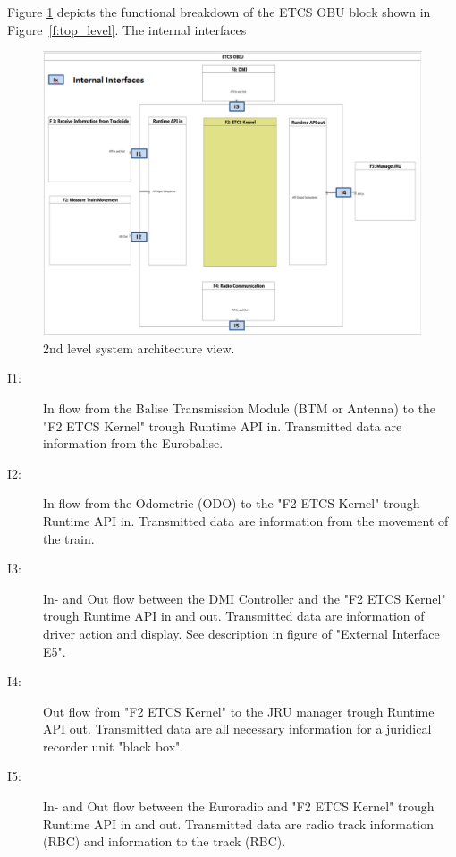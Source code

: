 Figure \ref{f:ETCS_OBU_decomposition} depicts the functional breakdown of the ETCS OBU block shown in Figure~\ref{f:top_level}. The internal interfaces
\begin{figure}
\centering
\includegraphics[width=\textwidth]{images/2ndlevelarchitecture}
\caption{2nd level system architecture view.}
\label{f:ETCS_OBU_decomposition}
\end{figure}
\begin{description}
\item[I1:] In flow from the Balise Transmission Module (BTM or Antenna) to the "F2 ETCS Kernel" trough Runtime API in. Transmitted data are information from the Eurobalise.

\item[I2:] In flow from the Odometrie (ODO) to the "F2 ETCS Kernel" trough Runtime API in. Transmitted data are information from the movement of the train.

\item[I3:] In- and Out flow between the DMI Controller and the "F2 ETCS Kernel" trough Runtime API in and out. Transmitted data are information of driver action and display. See description in figure of "External Interface E5".

\item[I4:] Out flow from "F2 ETCS Kernel" to the JRU manager trough Runtime API out. Transmitted data are all necessary information for a juridical recorder unit "black box".

\item[I5:] In- and Out flow between the Euroradio and "F2 ETCS Kernel" trough Runtime API in and out. Transmitted data are radio track information (RBC) and information to the track (RBC). 
\end{description}






